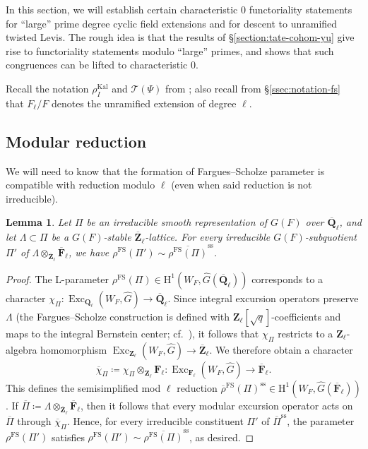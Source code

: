 \documentclass[reqno]{amsart}
\numberwithin{equation}{subsection}
\newcommand{\F}{\mathbf{F}}
\newcommand{\Q}{\mathbf{Q}}
\newcommand{\Z}{\mathbf{Z}}
\newcommand{\ol}[1]{\overline{#1}}
\newcommand{\wh}[1]{\widehat{#1}}
\newcommand{\co}{\colon}
\newcommand\cT{\mathcal{T}}
\DeclareMathOperator{\Exc}{Exc}
\DeclareMathOperator{\FS}{FS}
\DeclareMathOperator{\Kal}{Kal}
\newcommand{\rH}{\ensuremath{\mathrm{H}}\xspace}
\renewcommand{\ss}{\mathrm{ss}}
\newtheorem{lemma}[thm]{Lemma}
\theoremstyle{remark}
\numberwithin{equation}{subsection}
\numberwithin{figure}{subsection}
\begin{document}
In this section, we will establish certain characteristic $0$ functoriality statements for ``large'' prime degree cyclic field extensions and for descent to unramified twisted Levis. The rough idea is that the results of \S\ref{section:tate-cohom-yu} give rise to functoriality statements modulo ``large'' primes, and \cite[Lemma~5.3.2]{Cot26b} shows that such congruences can be lifted to characteristic $0$.

Recall the notation $\rho_I^{\Kal}$ and $\cT(\Psi)$ from \cite[\S 7.2]{CF26a}; also recall from \S\ref{ssec:notation-fs} that $F_\ell/F$ denotes the unramified extension of degree $\ell$.




\subsection{Modular reduction}\label{ssec:modular-reduction} We will need to know that the formation of Fargues--Scholze parameter is compatible with reduction modulo $\ell$ (even when said reduction is not irreducible).








\begin{lemma}\label{lem:L-parameter-of-reduction}
Let $\Pi$ be an irreducible smooth representation of $G(F)$ over $\ol \Q_\ell$, and let $\Lambda\subset \Pi$ be a $G(F)$-stable $\ol \Z_\ell$-lattice. For every irreducible $G(F)$-subquotient $\Pi'$ of $\Lambda\otimes_{\ol\Z_\ell}\ol\F_\ell$, we have $\rho^{\FS}(\Pi')\sim \ol{\rho^{\FS}(\Pi)}^{\ss}$.
\end{lemma}

\begin{proof}
The L-parameter $\rho^{\FS}(\Pi) \in \rH^1(W_F, \wh{G}(\ol \Q_\ell))$ corresponds to a character $\chi_{\Pi} \co \Exc_{\Q_\ell}(W_F, \wh{G}) \rightarrow \ol \Q_\ell$. Since integral excursion operators preserve $\Lambda$ (the Fargues--Scholze construction is defined with $\Z_\ell[\sqrt q]$-coefficients and maps to the integral Bernstein center; cf.\ \cite[Chapter IX]{FS}), it follows that $\chi_{\Pi}$ restricts to a $\Z_\ell$-algebra homomorphism $\Exc_{\Z_\ell}(W_F,\wh G)\to \ol\Z_\ell$. We therefore obtain a character
\[
\ol \chi_{\Pi} \coloneqq \chi_{\Pi} \otimes_{\Z_\ell} \F_\ell  \co \Exc_{\F_\ell}(W_F, \wh{G}) \rightarrow \ol \F_\ell.
\]
This defines the semisimplified mod $\ell$ reduction $\ol \rho^{\FS}(\Pi)^{\ss} \in \rH^1(W_F, \wh{G}(\ol \F_\ell))$. If $\ol{\Pi}\coloneqq \Lambda \otimes_{\ol\Z_\ell}\ol\F_\ell$, then it follows that every modular excursion operator acts on $\ol\Pi$ through $\ol\chi_\Pi$. Hence, for every irreducible constituent $\Pi'$ of $\ol\Pi^{\ss}$, the parameter $\rho^{\FS}(\Pi')$ satisfies $\rho^{\FS}(\Pi')\sim \ol{\rho^{\FS}(\Pi)}^{\ss}$, as desired.
\end{proof}
\end{document}
